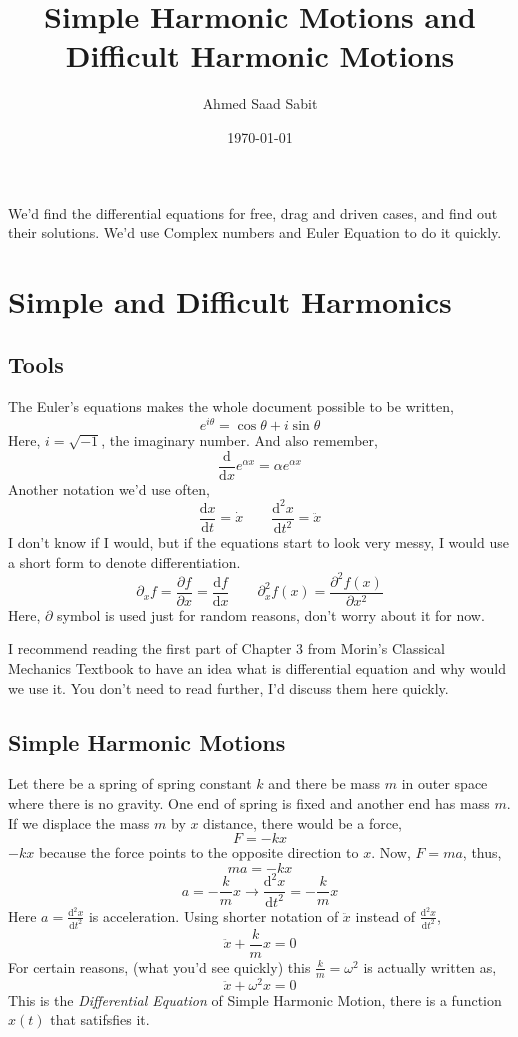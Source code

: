\documentclass[11pt, a4paper]{memoir}
\title{Simple Harmonic Motions and \\ Difficult Harmonic Motions}
\author{Ahmed Saad Sabit}
\date{\today}
\begin{document}
\maketitle
We'd find the differential equations for free, drag and driven cases, and find out their solutions. We'd use Complex numbers and Euler Equation to do it quickly. 
\tableofcontents
\chapter{Simple and Difficult Harmonics}
\section{ Tools}
The Euler's equations makes the whole document possible to be written,
\[ 
e^{i \theta} = \cos \theta + i \sin \theta
\]Here, $i = \sqrt{-1} $, the imaginary number. 
And also remember,
\[ 
\frac{\mathrm{d} }{\mathrm{d} x} e^{\alpha x} = \alpha e^{\alpha x}
\]
Another notation we'd use often,
\[ 
\frac{\mathrm{d} x}{\mathrm{d} t} = \dot{x} \quad \quad \frac{\mathrm{d} ^2 x}{\mathrm{d} t^2} = \ddot{x}
\]
I don't know if I would, but if the equations start to look very messy, I would use a short form to denote differentiation.
\[ 
    \partial_{ x} f = \frac{\partial f}{\partial x} = \frac{\mathrm{d} f}{\mathrm{d} x} \quad \quad \partial_{ x}^{2} f(x) = \frac{\partial ^2 f(x)}{\partial x^2}
\]
Here, $\partial$ symbol is used just for random reasons, don't worry about it for now. 


I recommend reading the first part of Chapter 3 from Morin's Classical Mechanics Textbook to have an idea what is differential equation and why would we use it. You don't need to read further, I'd discuss them here quickly.


\section{ Simple Harmonic Motions}
Let there be a spring of spring constant $k$ and there be mass $m$ in outer space where there is no gravity. One end of spring is fixed and another end has mass $m$. If we displace the mass $m$ by $x$ distance, there would be a force, 
\[ 
F = - kx
\]
$-kx$ because the force points to the opposite direction to $x$. Now, $F = ma$, thus,
\[ 
ma = - kx
\]
\[ 
a = - \frac{k}{m} x \to \frac{\mathrm{d} ^2 x}{\mathrm{d} t^2} = -\frac{k}{m} x
\]
Here $a = \frac{\mathrm{d} ^2 x}{\mathrm{d} t^2} $ is acceleration. Using shorter notation of $ \ddot{ x} $ instead of $ \frac{\mathrm{d} ^2 x}{\mathrm{d} t^2}$, 
\[ 
\boxed{ \ddot{x} + \frac{k}{m} x=0}
\]
For certain reasons, (what you'd see quickly) this $\frac{k}{m} = \omega^2$ is actually written as,
\[ 
\boxed{ \ddot{x} + \omega^2 x=0}
\]
This is the \emph{Differential Equation} of Simple Harmonic Motion, there is a function $x\left( t \right) $ that satifsfies it.  
\end{document}
